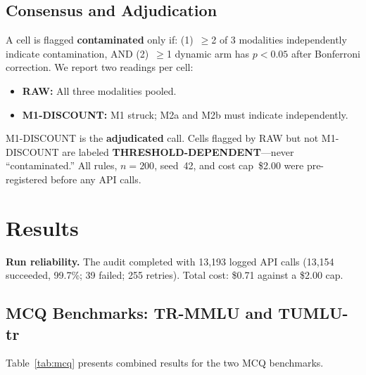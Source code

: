 \documentclass[letterpaper]{article}
\begin{document}
\subsection{Consensus and Adjudication}
A cell is flagged \textbf{contaminated} only if: (1)~$\geq$2 of 3 modalities independently indicate contamination, AND (2)~$\geq$1 dynamic arm has $p<0.05$ after Bonferroni correction. We report two readings per cell:
\begin{itemize}
\item \textbf{RAW:} All three modalities pooled.
\item \textbf{M1-DISCOUNT:} M1 struck; M2a and M2b must indicate independently.
\end{itemize}
M1-DISCOUNT is the \textbf{adjudicated} call. Cells flagged by RAW but not M1-DISCOUNT are labeled \textbf{THRESHOLD-DEPENDENT}---never ``contaminated.'' All rules, $n=200$, seed~42, and cost cap~\$2.00 were pre-registered before any API calls.

\section{Results}

\textbf{Run reliability.} The audit completed with 13,193 logged API calls (13,154 succeeded, 99.7\%; 39 failed; 255 retries). Total cost: \$0.71 against a \$2.00 cap.

\subsection{MCQ Benchmarks: TR-MMLU and TUMLU-tr}
Table~\ref{tab:mcq} presents combined results for the two MCQ benchmarks.
\end{document}
